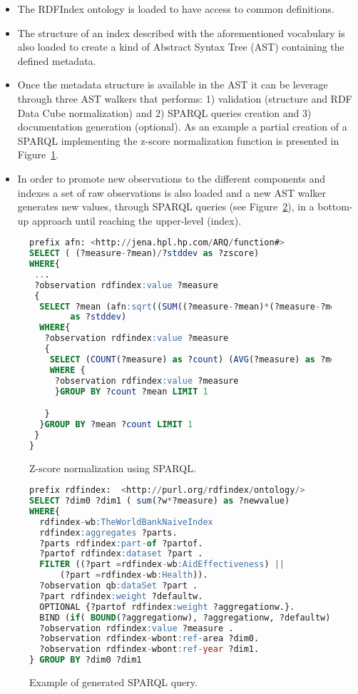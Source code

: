 \begin{itemize}
 \item The RDFIndex ontology is loaded to have access to common definitions.
 \item The structure of an index described with the aforementioned vocabulary is 
 also loaded to create a kind of Abstract Syntax Tree (AST) containing the defined metadata.
 \item Once the metadata structure is available in the AST it can be leverage 
 through three AST walkers that performs: 1) validation (structure and RDF Data Cube normalization) 
 and 2) SPARQL queries creation and 3) documentation generation (optional). As an example a partial creation of a SPARQL implementing 
 the z-score normalization function is presented in Figure~\ref{fig:sparql-zscore}.
 \item In order to promote new observations to the different components and indexes 
 a set of raw observations is also loaded and a new AST walker generates new values, through SPARQL queries (see Figure~\ref{fig:sparql-generated-query}), 
 in a bottom-up approach until reaching the upper-level (index).
 \end{itemize}

\begin{figure}[!ht]
\begin{lstlisting}[language=SQL]  
prefix afn: <http://jena.hpl.hp.com/ARQ/function#>
SELECT ( (?measure-?mean)/?stddev as ?zscore) 
WHERE{
 ...
 ?observation rdfindex:value ?measure 
 {
  SELECT ?mean (afn:sqrt((SUM((?measure-?mean)*(?measure-?mean))/?count)) 
		as ?stddev) 
  WHERE{ 
   ?observation rdfindex:value ?measure 
   {
    SELECT (COUNT(?measure) as ?count) (AVG(?measure) as ?mean)
    WHERE {
     ?observation rdfindex:value ?measure 
     }GROUP BY ?count ?mean LIMIT 1

   }	
  }GROUP BY ?mean ?count LIMIT 1
 }
}
\end{lstlisting}
\caption{Z-score normalization using SPARQL.}
 \label{fig:sparql-zscore}
\end{figure}


% 
\begin{figure}[!ht]
\begin{lstlisting}[language=SQL]  
prefix rdfindex:  <http://purl.org/rdfindex/ontology/> 
SELECT ?dim0 ?dim1 ( sum(?w*?measure) as ?newvalue) 
WHERE{ 
  rdfindex-wb:TheWorldBankNaiveIndex  
  rdfindex:aggregates ?parts.
  ?parts rdfindex:part-of ?partof.
  ?partof rdfindex:dataset ?part .
  FILTER ((?part =rdfindex-wb:AidEffectiveness) || 
	  (?part =rdfindex-wb:Health)). 
  ?observation qb:dataSet ?part . 
  ?part rdfindex:weight ?defaultw.        
  OPTIONAL {?partof rdfindex:weight ?aggregationw.}.
  BIND (if( BOUND(?aggregationw), ?aggregationw, ?defaultw) AS ?w)
  ?observation rdfindex:value ?measure . 
  ?observation rdfindex-wbont:ref-area ?dim0. 
  ?observation rdfindex-wbont:ref-year ?dim1. 
} GROUP BY ?dim0 ?dim1 
\end{lstlisting}
\caption{Example of generated SPARQL query.}
 \label{fig:sparql-generated-query}
\end{figure}

